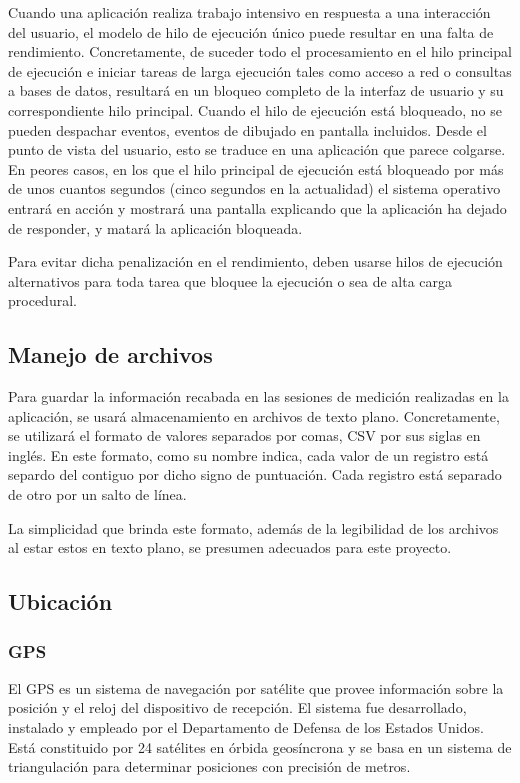 Cuando una aplicación realiza trabajo intensivo en respuesta a una interacción del usuario, el modelo de hilo de ejecución único puede resultar en una falta de rendimiento. Concretamente, de suceder todo el procesamiento en el hilo principal de ejecución e iniciar tareas de larga ejecución tales como acceso a red o consultas a bases de datos, resultará en un bloqueo completo de la interfaz de usuario y su correspondiente hilo principal. Cuando el hilo de ejecución está bloqueado, no se pueden despachar eventos, eventos de dibujado en pantalla incluidos. Desde el punto de vista del usuario, esto se traduce en una aplicación que parece colgarse. En peores casos, en los que el hilo principal de ejecución está bloqueado por más de unos cuantos segundos (cinco segundos en la actualidad) el sistema operativo entrará en acción y mostrará una pantalla explicando que la aplicación ha dejado de responder, y matará la aplicación bloqueada. 

 Para evitar dicha penalización en el rendimiento, deben usarse hilos de ejecución alternativos para toda tarea que bloquee la ejecución o sea de alta carga procedural.

\subsection{Manejo de archivos}

Para guardar la información recabada en las sesiones de medición realizadas en la aplicación, se usará almacenamiento en archivos de texto plano. Concretamente, se utilizará el formato de valores separados por comas, CSV por sus siglas en inglés. En este formato, como su nombre indica, cada valor de un registro está separdo del contiguo por dicho signo de puntuación. Cada registro está separado de otro por un salto de línea.

La simplicidad que brinda este formato, además de la legibilidad de los archivos al estar estos en texto plano, se presumen adecuados para este proyecto.

\subsection{Ubicación}
\subsubsection{GPS}
El \ac{GPS} es un sistema de navegación por satélite que provee información sobre la posición y el reloj del dispositivo de recepción. El sistema fue desarrollado, instalado y empleado por el Departamento de Defensa de los Estados Unidos. Está constituido por 24 satélites en órbida geosíncrona y se basa en un sistema de triangulación para determinar posiciones con precisión de metros.

